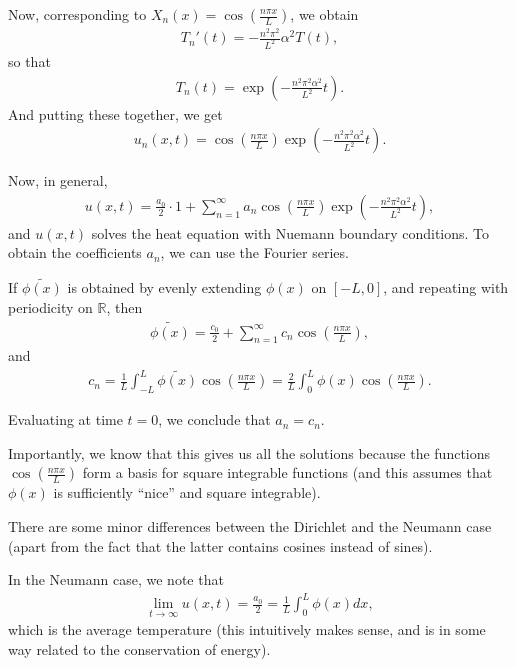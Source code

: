 \documentclass{article}
\newcommand{\RR}{\mathbb{R}}
\begin{document}
Now, corresponding to $X_n(x) = \cos \left( \frac{n \pi x}{L} \right)$, we obtain
\begin{align*}
  T_n'(t) = - \frac{n^2 \pi^2}{L^2} \alpha^2 T(t),
\end{align*}
so that
\begin{align*}
  T_n(t) = \exp \left( - \frac{n^2 \pi^2 \alpha^2}{L^2} t \right).
\end{align*}
And putting these together, we get
\begin{align*}
  u_n (x, t) = \cos \left( \frac{n \pi x}{L} \right) \exp \left( - \frac{n^2 \pi^2 \alpha^2}{L^2} t \right).
\end{align*}

Now, in general, 
\begin{align*}
  u(x, t) = \frac{a_0}{2} \cdot 1 + \sum_{n=1}^{\infty} a_n \cos \left( \frac{n \pi x}{L} \right) \exp \left( - \frac{n^2 \pi^2 \alpha^2}{L^2} t \right),
\end{align*}
and $u(x, t)$ solves the heat equation with Nuemann boundary conditions.  To obtain the coefficients $a_n$, we can use the Fourier series.

If $\tilde{\phi(x)}$ is obtained by evenly extending $\phi(x)$ on $[-L, 0]$, and repeating with periodicity on $\RR$, then
\begin{align*}
  \tilde{\phi(x)} = \frac{c_0}{2} + \sum_{n=1}^{\infty} c_n \cos \left( \frac{n \pi x}{L} \right),
\end{align*}
and
\begin{align*}
  c_n = \frac{1}{L} \int_{-L}^{L} \tilde{\phi(x)} \cos \left( \frac{n \pi x}{L} \right) = \frac{2}{L} \int_{0}^{L} \phi(x) \cos \left( \frac{n \pi x}{L} \right).
\end{align*}

Evaluating at time $t = 0$, we conclude that $a_n = c_n$.

Importantly, we know that this gives us all the solutions because the functions $\cos \left( \frac{n \pi x}{L} \right)$ form a basis for square integrable functions (and this assumes that $\phi(x)$ is sufficiently ``nice'' and square integrable).

There are some minor differences between the Dirichlet and the Neumann case (apart from the fact that the latter contains cosines instead of sines).

In the Neumann case, we note that
\begin{align*}
  \lim_{t \to \infty} u(x, t) = \frac{a_0}{2} = \frac{1}{L} \int_{0}^{L} \phi(x) dx,
\end{align*}
which is the average temperature (this intuitively makes sense, and is in some way related to the conservation of energy).
\end{document}
